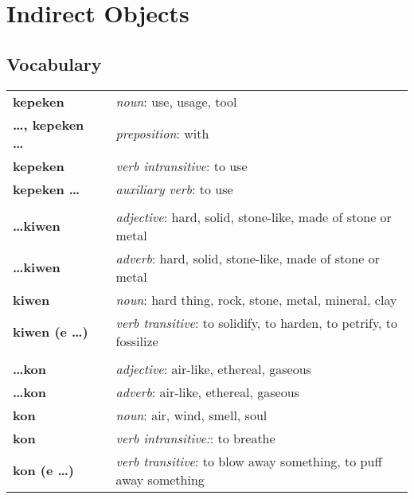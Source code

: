 \section{Indirect Objects}
%
\subsection*{Vocabulary}
\begin{supertabular}{p{2,5cm}|ll}
%
\textbf{kepeken} && \textit{noun}: use, usage, tool \\ %
\textbf{\dots , kepeken \dots} && \textit{preposition}: with \\ %
\textbf{kepeken} && \textit{verb intransitive}: to use \\ %
\textbf{kepeken \dots} && \textit{auxiliary verb}: to use \\ %
 && \\ %
%
\textbf{\dots kiwen} && \textit{adjective}: hard, solid, stone-like, made of stone or metal \\ %
\textbf{\dots kiwen} && \textit{adverb}: hard, solid, stone-like, made of stone or metal \\ %
\textbf{kiwen} && \textit{noun}: hard thing, rock, stone, metal, mineral, clay \\ %
\textbf{kiwen (e \dots)} && \textit{verb transitive}: to solidify, to harden, to petrify, to fossilize \\ %
 && \\ %
%
\textbf{\dots kon} && \textit{adjective}: air-like, ethereal, gaseous \\ %
\textbf{\dots kon} && \textit{adverb}: air-like, ethereal, gaseous \\ %
\textbf{kon} && \textit{noun}: air, wind, smell, soul \\ %
\textbf{kon} && \textit{verb intransitive:}: to breathe \\ %
\textbf{kon (e \dots)} && \textit{verb transitive}: to blow away something, to puff away something \\ %

\end{supertabular}
